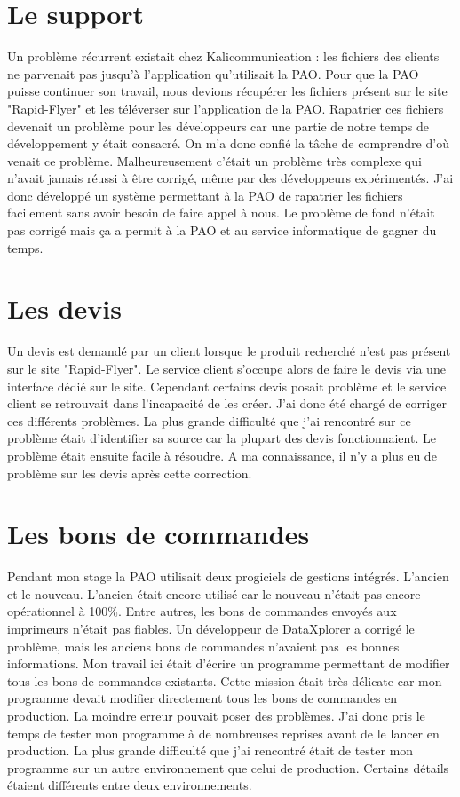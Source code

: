 
\section{Le support}
Un problème récurrent existait chez Kalicommunication : les fichiers des clients ne parvenait pas jusqu'à l'application qu'utilisait la PAO. Pour que la PAO puisse continuer son travail, nous devions récupérer les fichiers présent sur le site "Rapid-Flyer" et les téléverser sur l'application de la PAO.\newline
Rapatrier ces fichiers devenait un problème pour les développeurs car une partie de notre temps de développement y était consacré.\newline
On m'a donc confié la tâche de comprendre d'où venait ce problème. Malheureusement c'était un problème très complexe qui n'avait jamais réussi à être corrigé, même par des développeurs expérimentés. J'ai donc développé un système permettant à la PAO de rapatrier les fichiers facilement sans avoir besoin de faire appel à nous. Le problème de fond n'était pas corrigé mais ça a permit à la PAO et au service informatique de gagner du temps.

\section{Les devis}
Un devis est demandé par un client lorsque le produit recherché n'est pas présent sur le site "Rapid-Flyer". Le service client s'occupe alors de faire le devis via une interface dédié sur le site. Cependant certains devis posait problème et le service client se retrouvait dans l'incapacité de les créer.\newline
J'ai donc été chargé de corriger ces différents problèmes. La plus grande difficulté que j'ai rencontré sur ce problème était d'identifier sa source car la plupart des devis fonctionnaient. Le problème était ensuite facile à résoudre. A ma connaissance, il n'y a plus eu de problème sur les devis après cette correction.

\section{Les bons de commandes}
Pendant mon stage la PAO utilisait deux progiciels de gestions intégrés. L'ancien et le nouveau. L'ancien était encore utilisé car le nouveau n'était pas encore opérationnel à 100\%. Entre autres, les bons de commandes envoyés aux imprimeurs n'était pas fiables. Un développeur de DataXplorer a corrigé le problème, mais les anciens bons de commandes n'avaient pas les bonnes informations. Mon travail ici était d'écrire un programme permettant de modifier tous les bons de commandes existants. Cette mission était très délicate car mon programme devait modifier directement tous les bons de commandes en production. La moindre erreur pouvait poser des problèmes. J'ai donc pris le temps de tester mon programme à de nombreuses reprises avant de le lancer en production. La plus grande difficulté que j'ai rencontré était de tester mon programme sur un autre environnement que celui de production. Certains détails étaient différents entre deux environnements.

